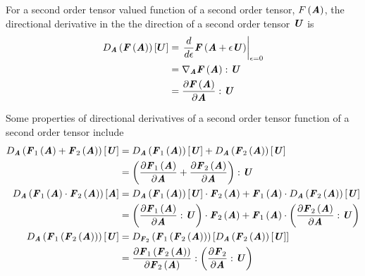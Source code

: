 For a second order tensor valued function of a second order tensor, $ F\left( \boldsymbol{\mathit{A}} \right) $,
the directional derivative in the the direction of a second order tensor
$\boldsymbol{\mathit{U}}$ is
\begin{equation}
  \begin{split}
    \directionalderiv{\tensor{A}}{\fnof{\tensor{F}}{\tensor{A}}}{\vectr{U}}&=\evalat{\dfrac{d}{d\epsilon}\fnof{\tensor{F}}{\tensor{A}+\epsilon\tensor{U}}}{\epsilon=0}\\
    &=\doubledotprod{\gradient{\tensor{A}}{\fnof{\tensor{F}}{\tensor{A}}}}{\tensor{U}}\\
    &=\doubledotprod{\delby{\fnof{\tensor{F}}{\tensor{A}}}{\tensor{A}}}{\tensor{U}}\\
  \end{split}  
\end{equation}

Some properties of directional derivatives of a second order tensor function
of a second order tensor include
\begin{equation}
  \begin{split}
    \directionalderiv{\tensor{A}}{\fnof{\tensor{F}_{1}}{\tensor{A}}+\fnof{\tensor{F}_{2}}{\tensor{A}}}{\tensor{U}}&=\directionalderiv{\tensor{A}}{\fnof{\tensor{F}_{1}}{\tensor{A}}}{\tensor{U}}+\directionalderiv{\tensor{A}}{\fnof{\tensor{F}_{2}}{\tensor{A}}}{\tensor{U}}\\
    &=\doubledotprod{\pbrac{\delby{\fnof{\tensor{F}_{1}}{\tensor{A}}}{\tensor{A}}+\delby{\fnof{\tensor{F}_{2}}{\tensor{A}}}{\tensor{A}}}}{\tensor{U}}\\
    \directionalderiv{\tensor{A}}{\dotprod{\fnof{\tensor{F}_{1}}{\tensor{A}}}{\fnof{\tensor{F}_{2}}{\tensor{A}}}}{\tensor{A}}&=\dotprod{\directionalderiv{\tensor{A}}{\fnof{\tensor{F}_{1}}{\tensor{A}}}{\tensor{U}}}{\fnof{\tensor{F}_{2}}{\tensor{A}}}+\dotprod{\fnof{\tensor{F}_{1}}{\tensor{A}}}{\directionalderiv{\tensor{A}}{\fnof{\tensor{F}_{2}}{\tensor{A}}}{\tensor{U}}}\\
    &=\dotprod{\pbrac{\doubledotprod{\delby{\fnof{\tensor{F}_{1}}{\tensor{A}}}{\tensor{A}}}{\tensor{U}}}}{\fnof{\tensor{F}_{2}}{\tensor{A}}}+\dotprod{\fnof{\tensor{F}_{1}}{\tensor{A}}}{\pbrac{\doubledotprod{\delby{\fnof{\tensor{F}_{2}}{\tensor{A}}}{\tensor{A}}}{\tensor{U}}}}\\
    \directionalderiv{\tensor{A}}{\fnof{\tensor{F}_{1}}{\fnof{\tensor{F}_{2}}{\tensor{A}}}}{\tensor{U}}&=\directionalderiv{\tensor{F}_{2}}{\fnof{\tensor{F}_{1}}{\fnof{\tensor{F}_{2}}{\tensor{A}}}}{\directionalderiv{\tensor{A}}{\fnof{\tensor{F}_{2}}{\tensor{A}}}{\tensor{U}}}\\
    &=\doubledotprod{\delby{\fnof{\tensor{F}_{1}}{\fnof{\tensor{F}_{2}}{\tensor{A}}}}{\fnof{\tensor{F}_{2}}{\tensor{A}}}}{\pbrac{\doubledotprod{\delby{\tensor{F}_{2}}{\tensor{A}}}{\tensor{U}}}}
  \end{split}
\end{equation}


